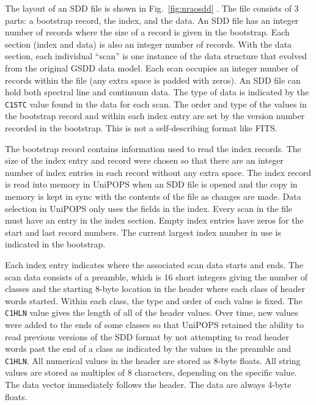 \documentclass[final,authoryear,5p,times,twocolumn]{elsarticle}
\begin{document}
The layout of an SDD file is shown in Fig.~\ref{fig:nraosdd}
\citep[see also][]{UNIPOPS}.  The file consists of 3 parts: a
bootstrap record, the index, and the data.  An SDD file has an integer
number of records where the size of a record is given in the
bootstrap.  Each section (index and data) is also an integer number of
records.  With the data section, each individual ``scan'' is one
instance of the data structure that evolved from the original GSDD
data model.  Each scan occupies an integer number of records within
the file (any extra space is padded with zeros).  An SDD file can hold
both spectral line and continuum data.  The type of data is indicated
by the \texttt{C1STC} value found in the data for each scan. The order
and type of the values in the bootstrap record and within each index
entry are set by the version number recorded in the bootstrap.  This
is not a self-describing format like FITS.

The bootstrap record contains information used to read the index
records.  The size of the index entry and record were chosen so that
there are an integer number of index entries in each record without
any extra space.  The index record is read into memory in UniPOPS when
an SDD file is opened and the copy in memory is kept in sync with the
contents of the file as changes are made.  Data selection in UniPOPS
only uses the fields in the index.  Every scan in the file must have
an entry in the index section.  Empty index entries have zeros for the
start and last record numbers.  The current largest index number in
use is indicated in the bootstrap.

Each index entry indicates where the associated scan data starts and
ends.  The scan data consists of a preamble, which is 16 short
integers giving the number of classes and the starting 8-byte location
in the header where each class of header words started.  Within each
class, the type and order of each value is fixed.  The \texttt{C1HLN}
value gives the length of all of the header values.  Over time, new
values were added to the ends of some classes so that UniPOPS retained
the ability to read previous versions of the SDD format by not
attempting to read header words past the end of a class as indicated
by the values in the preamble and \texttt{C1HLN}.  All numerical
values in the header are stored as 8-byte floats.  All string values
are stored as multiples of 8 characters, depending on the specific
value.  The data vector immediately follows the header.  The data are
always 4-byte floats.
\end{document}
